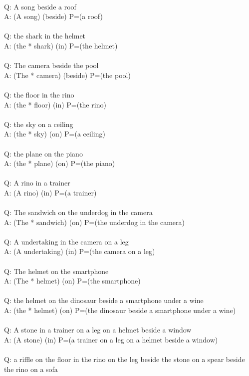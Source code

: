 \documentclass{article} \usepackage{iclr2022_conference,times}
\begin{document}
{ \\
Q: A song beside a roof \\
A: (A song) (beside) P=(a roof) \\
 \\
Q: the shark in the helmet \\
A: (the * shark) (in) P=(the helmet) \\
 \\
Q: The camera beside the pool \\
A: (The * camera) (beside) P=(the pool) \\
 \\
Q: the floor in the rino \\
A: (the * floor) (in) P=(the rino) \\
 \\
Q: the sky on a ceiling \\
A: (the * sky) (on) P=(a ceiling) \\
 \\
Q: the plane on the piano \\
A: (the * plane) (on) P=(the piano) \\
 \\
Q: A rino in a trainer \\
A: (A rino) (in) P=(a trainer) \\
 \\
Q: The sandwich on the underdog in the camera \\
A: (The * sandwich) (on) P=(the underdog in the camera) \\
 \\
Q: A undertaking in the camera on a leg \\
A: (A undertaking) (in) P=(the camera on a leg) \\
 \\
Q: The helmet on the smartphone \\
A: (The * helmet) (on) P=(the smartphone) \\
 \\
Q: the helmet on the dinosaur beside a smartphone under a wine \\
A: (the * helmet) (on) P=(the dinosaur beside a smartphone under a wine) \\
 \\
Q: A stone in a trainer on a leg on a helmet beside a window \\
A: (A stone) (in) P=(a trainer on a leg on a helmet beside a window) \\
 \\
Q: a riffle on the floor in the rino on the leg beside the stone on a spear beside the rino on a sofa \\
}
\end{document}

